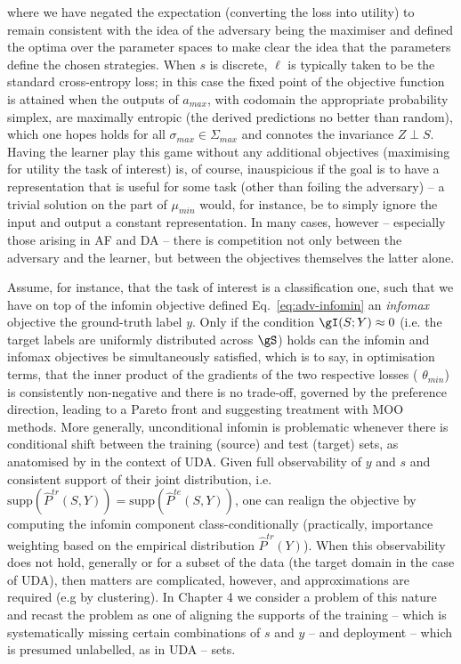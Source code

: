 %
where we have negated the expectation (converting the loss into utility) to remain consistent with
the idea of the adversary being the maximiser and defined the optima over the parameter spaces to
make clear the idea that the parameters define the chosen strategies. 
%
When \(s\) is discrete, \(\ell\) is typically taken to be the standard cross-entropy loss; in this
case the fixed point of the objective function is attained when the outputs of \(a_{max}\), with
codomain the appropriate probability simplex, are maximally entropic (the derived predictions no
better than random), which one hopes holds for all \(\sigma_{max} \in \Sigma_{max}\) and connotes
the invariance \(Z \perp S\).
%
%
Having the learner play this game without any additional objectives (maximising for utility \wrt{}
the task of interest) is, of course, inauspicious if the goal is to have a representation that is
useful for some task (other than foiling the adversary) -- a trivial solution on the part of
\(\mu_{min}\) would, for instance, be to simply ignore the input and output a constant
representation.
%
In many cases, however -- especially those arising in AF and DA -- there is competition not
only between the adversary and the learner, but between the objectives themselves \wrt{} the latter
alone.
%

Assume, for instance, that the task of interest is a classification one, such that we have on top
of the infomin objective defined Eq.~\ref{eq:adv-infomin} an \emph{infomax} objective \wrt{} the
ground-truth label \(y\).
%
Only if the condition \(\gI(S; Y) \approx 0 \) (i.e. the target labels are uniformly distributed
across \(\gS\)) holds can the infomin and infomax objectives be simultaneously satisfied, which is
to say, in optimisation terms, that the inner product of the gradients of the two respective losses
(\wrt{} \(\theta_{min}\)) is consistently non-negative and there is no trade-off, governed by the
preference direction, leading to a Pareto front and suggesting treatment with MOO methods.
%
More generally, unconditional infomin is problematic whenever there is conditional shift between
the training (source) and test (target) sets, as anatomised by \cite{zhao2019learning} in the
context of UDA. 
%
Given full observability of \(y\) and \(s\) and consistent support of their joint distribution,
i.e. \(\text{supp}(\hat{P}^{tr}(S, Y)) = \text{supp}(\hat{P}^{te}(S, Y))\), one can realign the
objective by computing the infomin component class-conditionally (practically, importance weighting
based on the empirical distribution \(\hat{P}^{tr}(Y)\)). 
%
When this observability does not hold, generally or for a subset of the data (the target domain in
the case of UDA), then matters are complicated, however, and approximations are required (e.g by
clustering).
%
In Chapter 4 we consider a problem of this nature and recast the problem as one of aligning the
supports of the training -- which is systematically missing certain combinations of \(s\) and \(y\)
-- and deployment -- which is presumed unlabelled, as in UDA -- sets.

